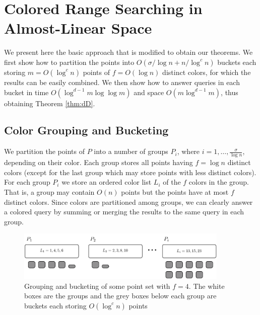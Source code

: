 \section{Colored Range Searching in Almost-Linear Space}
\label{sec:basics}
%
We present here the basic approach that is modified to obtain our theorems. We first show how to partition the points into $O(\sigma / \log n + n / \log ^c n)$ buckets each storing $m = O(\log ^c n)$ points of $f = O(\log n)$ distinct colors, for which the results can be easily combined. We then show how to answer queries in each bucket in time $O(\log ^{d-1} m \log \log m)$ and space $O(m \log ^{d-1} m)$, thus obtaining Theorem \ref{thm:dD}.

\subsection{Color Grouping and Bucketing}
%
We partition the points of $P$ into a number of groups $P_i$, where $i = 1, \ldots, \frac{\sigma}{\log n}$, depending on their color. Each group stores all points having $f = \log n$ distinct colors (except for the last group which may store points with less distinct colors). For each group $P_i$ we store an ordered color list $L_i$ of the $f$ colors in the group. That is, a group may contain $O(n)$ points but the points have at most $f$ distinct colors. Since colors are partitioned among groups, we can clearly answer a colored query by summing or merging the results to the same query in each group. 

\begin{figure}[tb]
	\begin{center}
	\includegraphics[width=0.9\textwidth]{chapters/papers/coloredrangecounting/groups-buckets}
	\caption{Grouping and bucketing of some point set with $f = 4$. The white boxes are the groups and the grey boxes below each group are buckets each storing $O(\log^c n)$ points\label{fig:groups-buckets}}
	\end{center}
\end{figure} 

